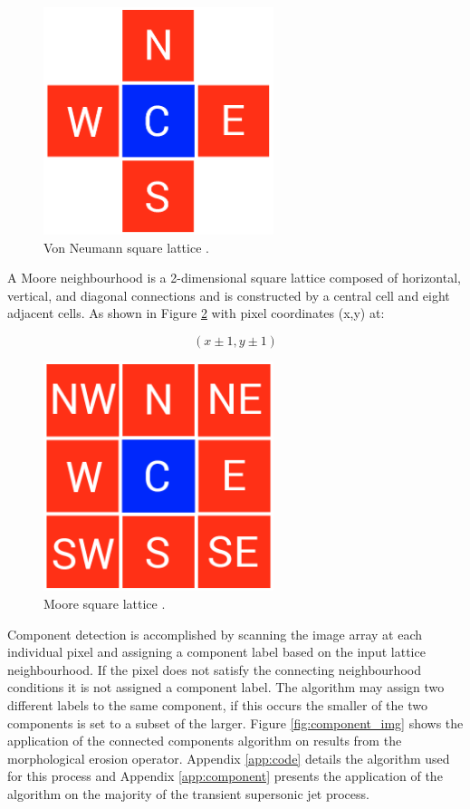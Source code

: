 \begin{figure}[H] 
	\centering
	\includegraphics[width=0.6\textwidth]{von.png} 
	\caption{Von Neumann square lattice \citep{ethan}.}
	\label{fig:von}
\end{figure}

A Moore neighbourhood is a 2-dimensional square lattice composed of horizontal, vertical, and diagonal connections and is constructed by a central cell and eight adjacent cells. As shown in Figure \ref{fig:moore} with pixel coordinates (x,y) at:

\begin{equation}
(x\pm1,y\pm1)
\end{equation}

\begin{figure}[H] 
	\centering
	\includegraphics[width=0.6\textwidth]{moore.png} 
	\caption{Moore square lattice \citep{ethan}.}
	\label{fig:moore}
\end{figure}

Component detection is accomplished by scanning the image array at each individual pixel and assigning a component label based on the input lattice neighbourhood. If the pixel does not satisfy the connecting neighbourhood conditions it is not assigned a component label. The algorithm may assign two different labels to the same component, if this occurs the smaller of the two components is set to a subset of the larger. Figure \ref{fig:component_img} shows the application of the connected components algorithm on results from the morphological erosion operator. Appendix \ref{app:code} details the algorithm used for this process and Appendix \ref{app:component} presents the application of the algorithm on the majority of the transient supersonic jet process.

